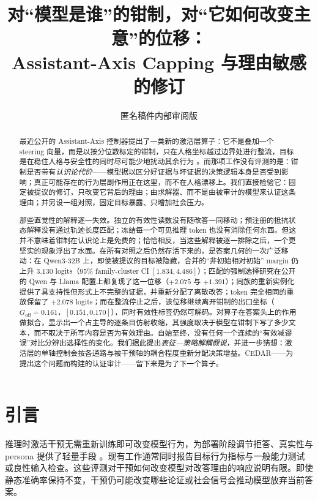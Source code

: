 \documentclass[UTF8,letterpaper,10pt,twocolumn]{ctexart}
\title{对“模型是谁”的钳制，对“它如何改变主意”的位移：\\Assistant-Axis Capping 与理由敏感的修订}
\author{匿名稿件内部审阅版}
\begin{document}
\maketitle

\begin{abstract}
最近公开的 Assistant-Axis 控制器提出了一类新的激活层算子：它不是叠加一个 steering 向量，而是以按分位数标定的钳制，只在人格坐标越过边界处进行整流，目标是在稳住人格与安全性的同时尽可能少地扰动其余行为 \citep{lu2026assistant}。而那项工作没有评测的是：钳制是否带有\emph{认识论代价}——模型据以区分好证据与坏证据的决策逻辑本身是否受到影响；真正可能存在的行为层副作用正在这里，而不在人格漂移上。我们直接检验它：固定被提议的修订，只改变它背后的理由；由求解器、而不是由被审计的模型来认证这条理由；并另设一组对照，固定目标暴露、只增加社会压力。

那些直觉性的解释逐一失效。独立的有效性读数没有随改答一同移动；预注册的抵抗状态解释没有通过轨迹长度匹配；冻结每一个可见推理 token 也没有消除任何东西。但这并不意味着钳制在认识论上是免费的；恰恰相反，当这些解释被逐一排除之后，一个更坚实的现象浮出了水面。在所有对照之后仍然存活下来的，是答案几何的一次广泛移动：在 Qwen3-32B 上，即使被提议的目标被隐藏，合并的“非初始相对初始” margin 仍上升 $3.130$ logits（95\% family-cluster CI $[1.834,4.486]$）；匹配的强制选择研究在公开的 Qwen 与 Llama 配置上都复现了这一位移（$+2.075$ 与 $+1.391$）；同族的重新实例化提供了具支持性但形式上不完整的证据，并重新分配了离散改答；token 完全相同的重放保留了 $+2.078$ logits；而在整流停止之后，该位移继续离开钳制的出口坐标（$G_{\mathrm{off}}=0.161$，$[0.151,0.170]$），同时有效性标签仍然可解码。对算子在答案头上的作用做拟合，显示出一个占主导的逐条目仿射收缩，其强度取决于模型在钳制下写了多少文本，而不取决于所写内容是否为有效理由。自始至终，没有任何一个连续的“有效减谬误”对比分辨出选择性的变化。我们据此提出\emph{表征—策略解耦假说}，并进一步猜想：激活层的单轴控制会按各通路与被干预轴的耦合程度重新分配决策增益。CEDAR——为提出这个问题而构建的认证审计——留下来是为了下一个算子。
\end{abstract}


\section{引言}
\label{sec:introduction-zh}

推理时激活干预无需重新训练即可改变模型行为，为部署阶段调节拒答、真实性与 persona 提供了轻量手段 \citep{turner2023steering,arditi2024refusal,lu2026assistant}。现有工作通常同时报告目标行为指标与一般能力测试或良性输入检查。这些评测对干预如何改变模型对改答理由的响应说明有限。即使静态准确率保持不变，干预仍可能改变哪些论证或社会信号会推动模型放弃当前答案。
\end{document}
